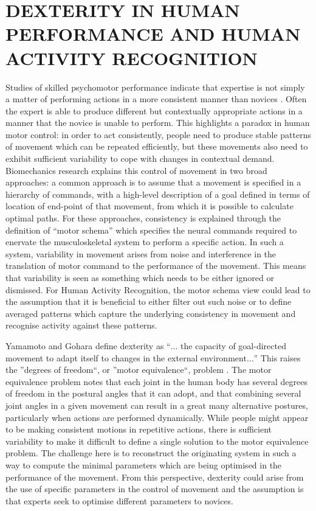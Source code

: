 \documentclass{sigchi}
\begin{document}
\section{DEXTERITY IN HUMAN PERFORMANCE AND HUMAN ACTIVITY RECOGNITION}
Studies of skilled psychomotor performance indicate that expertise is not simply a matter of performing actions 
in a more consistent manner than novices \cite{Kelso2014}. Often the expert is able to produce different but 
contextually appropriate actions in a manner that the novice is unable to perform. This highlights a paradox 
in human motor control: in order to act consistently, people need to produce stable patterns of movement 
which can be repeated efficiently, but these movements also need to exhibit sufficient variability to cope 
with changes in contextual demand. 
Biomechanics research explains this control of movement in two broad approaches: 
a common approach is to assume that a movement is specified in a hierarchy of commands, 
with a high-level description of a goal defined in terms of location of end-point of that movement, 
from which it is possible to calculate optimal paths. 
For these approaches, consistency is 
explained through the definition of ``motor schema'' which specifies the neural commands required to enervate 
the musculoskeletal system to perform a specific action. In such a system, variability in movement arises 
from noise and interference in the translation of motor command to the performance of the movement. 
This means that variability is seen as something which needs to be either ignored or dismissed. 
For Human Activity Recognition, the motor schema view could lead to the assumption that it is beneficial 
to either filter out such noise or to define averaged patterns which capture the underlying consistency 
in movement and recognise activity against these patterns. 

Yamamoto and Gohara \cite{Yamamoto2000} define dexterity as ``$\ldots$ the capacity of goal-directed movement 
to adapt itself to changes in the external environment$\ldots$''  
This raises the ''degrees of freedom``, or ''motor equivalence``, 
problem \cite{Bernstein1967}. 
The motor equivalence problem notes that each joint in the human body has several degrees of freedom in 
the postural angles that it can adopt, and that combining several joint angles in a given movement can 
result in a great many alternative postures, particularly when actions are performed dynamically. 
While people might appear to be making consistent motions in repetitive actions, there is sufficient 
variability to make it difficult to define a single solution to the motor equivalence problem. 
The challenge here is to reconstruct the originating system in such a way to 
compute the minimal parameters which are being optimised in the performance of the movement. 
From this perspective, dexterity could arise from the use of specific parameters in the control of movement and 
the assumption is that experts seek to optimise different parameters to novices. 
 
\end{document}

